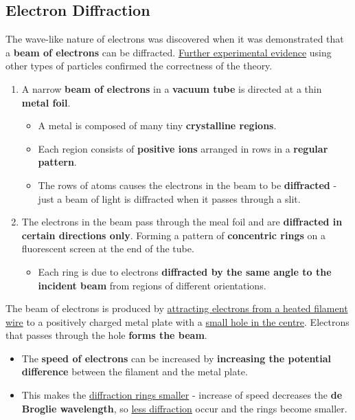 \subsection*{Electron Diffraction}

The wave-like nature of electrons was discovered when it was demonstrated that a \textbf{beam of electrons} can be diffracted. \underline{Further experimental evidence} using other types of particles confirmed the correctness of the theory.

\begin{enumerate}
    \item A narrow \textbf{beam of electrons} in a \textbf{vacuum tube} is directed at a thin \textbf{metal foil}.
        \begin{itemize}
            \item A metal is composed of many tiny \textbf{crystalline regions}.
            \item Each region consists of \textbf{positive ions} arranged in rows in a \textbf{regular pattern}.
            \item The rows of atoms causes the electrons in the beam to be \textbf{diffracted} - just a beam of light is diffracted when it passes through a slit.
        \end{itemize}
    \item The electrons in the beam pass through the meal foil and are \textbf{diffracted in certain directions only}. Forming a pattern of \textbf{concentric rings} on a fluorescent screen at the end of the tube.
        \begin{itemize}
            \item Each ring is due to electrons \textbf{diffracted by the same angle to the incident beam} from regions of different orientations.
        \end{itemize}
\end{enumerate}

The beam of electrons is produced by \underline{attracting electrons from a heated filament wire} to a positively charged metal plate with a \underline{small hole in the centre}. Electrons that passes through the hole \textbf{forms the beam}.
\begin{itemize}
    \item The \textbf{speed of electrons} can be increased by \textbf{increasing the potential difference} between the filament and the metal plate.
    \item This makes the \underline{diffraction rings smaller} - increase of speed decreases the \textbf{de Broglie wavelength}, so \underline{less diffraction} occur and the rings become smaller.
\end{itemize}


